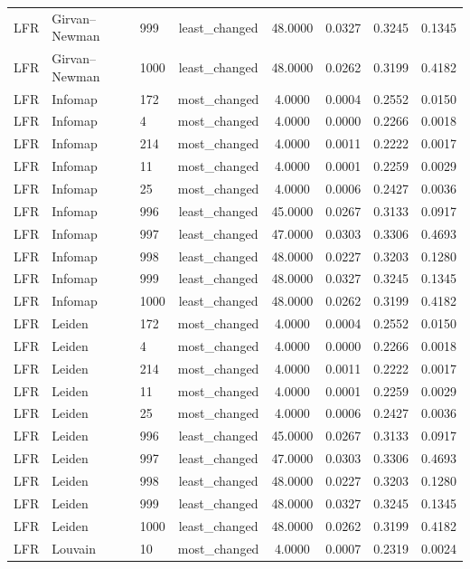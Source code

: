 \begin{longtable}{lllccccc}
LFR & Girvan--Newman & 999 & least\_changed & 48.0000 & 0.0327 & 0.3245 & 0.1345 \\
LFR & Girvan--Newman & 1000 & least\_changed & 48.0000 & 0.0262 & 0.3199 & 0.4182 \\
LFR & Infomap & 172 & most\_changed & 4.0000 & 0.0004 & 0.2552 & 0.0150 \\
LFR & Infomap & 4 & most\_changed & 4.0000 & 0.0000 & 0.2266 & 0.0018 \\
LFR & Infomap & 214 & most\_changed & 4.0000 & 0.0011 & 0.2222 & 0.0017 \\
LFR & Infomap & 11 & most\_changed & 4.0000 & 0.0001 & 0.2259 & 0.0029 \\
LFR & Infomap & 25 & most\_changed & 4.0000 & 0.0006 & 0.2427 & 0.0036 \\
LFR & Infomap & 996 & least\_changed & 45.0000 & 0.0267 & 0.3133 & 0.0917 \\
LFR & Infomap & 997 & least\_changed & 47.0000 & 0.0303 & 0.3306 & 0.4693 \\
LFR & Infomap & 998 & least\_changed & 48.0000 & 0.0227 & 0.3203 & 0.1280 \\
LFR & Infomap & 999 & least\_changed & 48.0000 & 0.0327 & 0.3245 & 0.1345 \\
LFR & Infomap & 1000 & least\_changed & 48.0000 & 0.0262 & 0.3199 & 0.4182 \\
LFR & Leiden & 172 & most\_changed & 4.0000 & 0.0004 & 0.2552 & 0.0150 \\
LFR & Leiden & 4 & most\_changed & 4.0000 & 0.0000 & 0.2266 & 0.0018 \\
LFR & Leiden & 214 & most\_changed & 4.0000 & 0.0011 & 0.2222 & 0.0017 \\
LFR & Leiden & 11 & most\_changed & 4.0000 & 0.0001 & 0.2259 & 0.0029 \\
LFR & Leiden & 25 & most\_changed & 4.0000 & 0.0006 & 0.2427 & 0.0036 \\
LFR & Leiden & 996 & least\_changed & 45.0000 & 0.0267 & 0.3133 & 0.0917 \\
LFR & Leiden & 997 & least\_changed & 47.0000 & 0.0303 & 0.3306 & 0.4693 \\
LFR & Leiden & 998 & least\_changed & 48.0000 & 0.0227 & 0.3203 & 0.1280 \\
LFR & Leiden & 999 & least\_changed & 48.0000 & 0.0327 & 0.3245 & 0.1345 \\
LFR & Leiden & 1000 & least\_changed & 48.0000 & 0.0262 & 0.3199 & 0.4182 \\
LFR & Louvain & 10 & most\_changed & 4.0000 & 0.0007 & 0.2319 & 0.0024 \\

\end{longtable}
